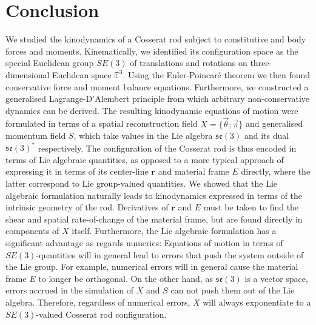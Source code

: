 


\section{Conclusion}

We studied the kinodynamics of a Cosserat rod subject to constitutive and body forces and moments. Kinematically, we identified its configuration space as the special Euclidean group $SE(3)$ of translations and rotations on three-dimensional Euclidean space $\mathbb{E}^3$. Using the Euler-Poincaré theorem we then found conservative force and moment balance equations. Furthermore, we constructed a generalised Lagrange-D'Alembert principle from which arbitrary non-conservative dynamics can be derived. The resulting kinodynamic equations of motion were formulated in terms of a spatial reconstruction field $X = \{ \vec{\theta} ; \vec{\pi} \}$ and generalised momentum field $S$, which take values in the Lie algebra $\mathfrak{se}(3)$ and its dual $\mathfrak{se}(3)^*$ respectively. The configuration of the Cosserat rod is thus encoded in terms of Lie algebraic quantities, as opposed to a more typical approach of expressing it in terms of its center-line $\mathbf{r}$ and material frame $E$ directly, where the latter correspond to Lie group-valued quantities. We showed that the Lie algebraic formulation naturally leads to kinodynamics expressed in terms of the intrinsic geometry of the rod. Derivatives of $\mathbf{r}$ and $E$ must be taken to find the shear and spatial rate-of-change of the material frame, but are found directly in components of $X$ itself. Furthermore, the Lie algebraic formulation has a significant advantage as regards  numerics: Equations of motion in terms of $SE(3)$-quantities will in general lead to errors that push the system outside of the Lie group. For example, numerical errors will in general cause the material frame $E$ to longer be orthogonal. On the other hand, as $\mathfrak{se}(3)$ is a vector space, errors accrued in the simulation of $X$ and $S$ can not push them out of the Lie algebra. Therefore, regardless of numerical errors, $X$ will always exponentiate to a $SE(3)$-valued Cosserat rod configuration.

